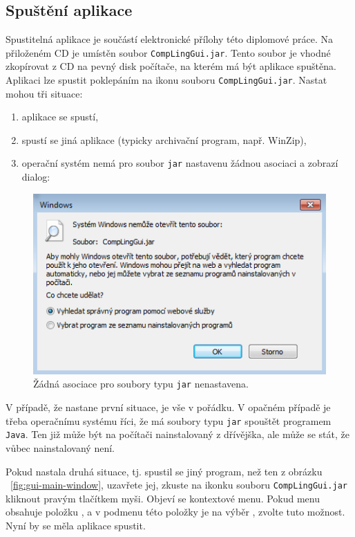 \documentclass[dp.tex]{subfiles}
\begin{document}
\subsection{Spuštění aplikace}

Spustitelná aplikace je součástí elektronické přílohy této diplomové práce. Na přiloženém CD je umístěn soubor \texttt{CompLingGui.jar}. Tento soubor je vhodné zkopírovat z CD na pevný disk počítače, na kterém má být aplikace spuštěna. Aplikaci lze spustit poklepáním na ikonu souboru \texttt{CompLingGui.jar}. Nastat mohou tři situace:

\begin{enumerate}
\item aplikace se spustí,
\item spustí se jiná aplikace (typicky archivační program, např. WinZip),
\item operační systém nemá pro soubor \texttt{jar} nastavenu žádnou asociaci a zobrazí dialog:
\end{enumerate}

\raggedbottom

\begin{figure}[H]
	\centering
	\includegraphics[max width=\textwidth,keepaspectratio=true] {imgs-60-aplikace/no-association}
	\caption{Žádná asociace pro soubory typu \texttt{jar} nenastavena.}
	\label{fig:no-association}
\end{figure}

V případě, že nastane první situace, je vše v pořádku. V opačném případě je třeba operačnímu systému říci, že má soubory typu \texttt{jar} spouštět programem \texttt{Java}. Ten již může být na počítači nainstalovaný z dřívějška, ale může se stát, že vůbec nainstalovaný není.

Pokud nastala druhá situace, tj. spustil se jiný program, než ten z obrázku ~\ref{fig:gui-main-window}, uzavřete jej, zkuste na ikonku souboru \texttt{CompLingGui.jar} kliknout pravým tlačítkem myši. Objeví se kontextové menu. Pokud menu obsahuje položku , a v podmenu této položky je na výběr , zvolte tuto možnost. Nyní by se měla aplikace spustit.
\end{document}
